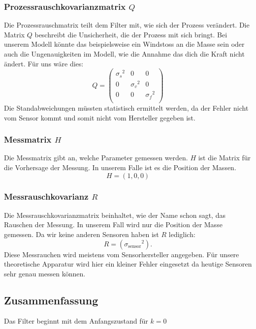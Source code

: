 \subsubsection*{Prozessrauschkovarianzmatrix $Q$}
Die Prozessrauschmatrix teilt dem Filter mit, wie sich der Prozess verändert. 
Die Matrix $Q$ beschreibt die Unsicherheit, die der Prozess mit sich bringt. 
Bei unserem Modell könnte das beispielsweise ein Windstoss an die Masse sein oder auch die Ungenauigkeiten im Modell, wie die Annahme das dich die Kraft nicht ändert.
Für uns wäre dies:
\[ 
Q = \left(
 \begin{array}{ccc} 	
{\sigma_s }^2& 0& 0 \\ 
0 & {\sigma_v }^2& 0\\ 
0 & 0& {\sigma_f }^2\\
\end{array}\right)  
 \]
Die Standabweichungen müssten statistisch ermittelt werden, da der Fehler nicht vom Sensor kommt und somit nicht vom Hersteller gegeben ist. 

\subsubsection*{Messmatrix $H$}
Die Messmatrix gibt an, welche Parameter gemessen werden. 
$H$ ist die Matrix für die Vorhersage der Messung.
In unserem Falle ist es die Position der Massen. 
\[ 
H = (1, 0, 0) 
\]

\subsubsection*{Messrauschkovarianz $R$}
Die Messrauschkovarianzmatrix beinhaltet, wie der Name schon sagt, das Rauschen der Messung. 
In unserem Fall wird nur die Position der Masse gemessen. Da wir keine anderen Sensoren haben ist $R$ lediglich:
\[ 
R= ({\sigma_\mathrm{sensor}}^2).
 \] 
Diese Messrauchen wird meistens vom Sensorhersteller angegeben. 
Für unsere theoretische Apparatur wird hier ein kleiner Fehler eingesetzt da heutige Sensoren sehr genau messen können. 

\subsection{Zusammenfassung }

Das Filter beginnt mit dem Anfangszustand für $k=0$

